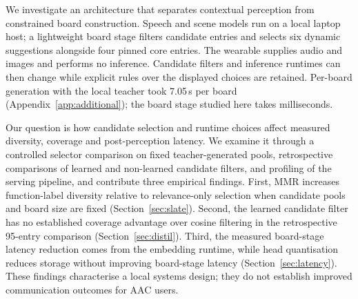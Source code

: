 We investigate an architecture that separates contextual perception from constrained board construction. Speech and scene models run on a local laptop host; a lightweight board stage filters candidate entries and selects six dynamic suggestions alongside four pinned core entries. The wearable supplies audio and images and performs no inference. Candidate filters and inference runtimes can then change while explicit rules over the displayed choices are retained. Per-board generation with the local teacher took 7.05\,s per board (Appendix~\ref{app:additional}); the board stage studied here takes milliseconds.

Our question is how candidate selection and runtime choices affect measured diversity, coverage and post-perception latency. We examine it through a controlled selector comparison on fixed teacher-generated pools, retrospective comparisons of learned and non-learned candidate filters, and profiling of the serving pipeline, and contribute three empirical findings. First, MMR increases function-label diversity relative to relevance-only selection when candidate pools and board size are fixed (Section~\ref{sec:slate}). %
Second, the learned candidate filter has no established coverage advantage over cosine filtering in the retrospective 95-entry comparison (Section~\ref{sec:distil}). %
Third, the measured board-stage latency reduction comes from the embedding runtime, while head quantisation reduces storage without improving board-stage latency (Section~\ref{sec:latency}). %
These findings characterise a local systems design; they do not establish improved communication outcomes for AAC users.

